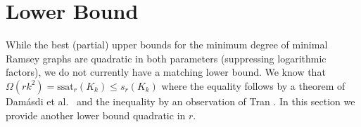 \documentclass[12pt]{article}
\newtheorem{proposition}{Proposition}
\theoremstyle{definition}
\begin{document}
	
	
	
	
	\section{Lower Bound}\label{sec:lowerbounds}
	While the best (partial) upper bounds for the minimum degree of minimal Ramsey graphs are quadratic in both parameters (suppressing logarithmic factors), we do not currently have a matching lower bound. We know that $\Omega(rk^2)=\mathrm{ssat}_r(K_k)\leq s_r(K_{k})$ where the equality follows by a theorem of Damásdi et al.\ \cite{damasdi2021saturation} and the inequality by an observation of Tran \cite{tran2022two}. In this section we provide another lower bound quadratic in $r$.
	
	
		
\end{document}
